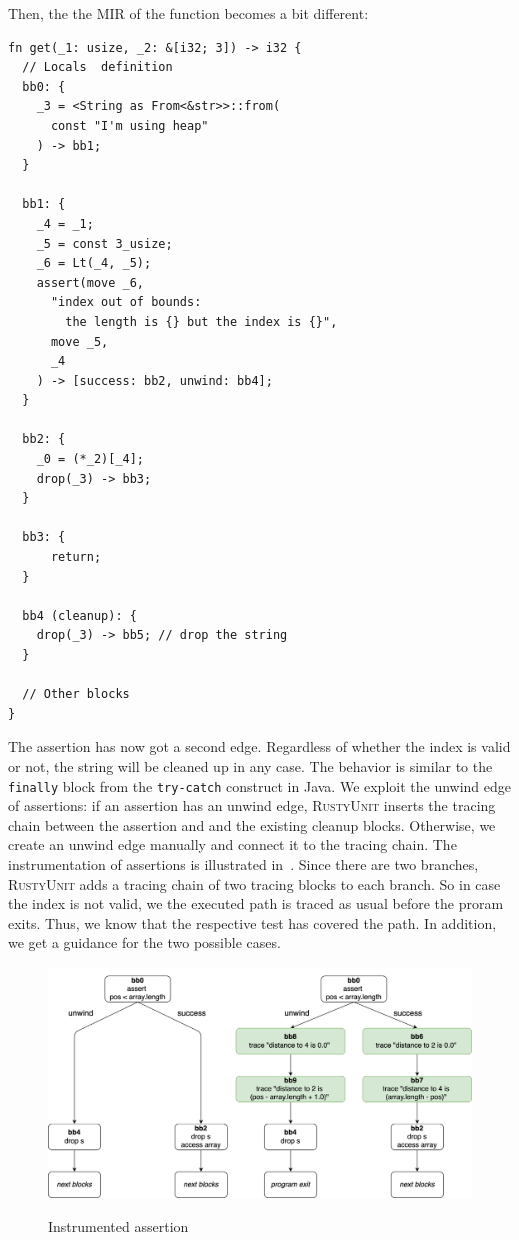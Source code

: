 \documentclass[paper=a4,%
  twoside,%
  BCOR4mm,%
  abstract=true,%
  toc=bibliography,%
  chapterprefix=true,%
  toc=bibliographynumbered,%
  open=right,%
  english,%
  pagesize=pdftex]{scrreprt}
\newcommand{\tech}{\textsc{RustyUnit}\xspace}
\newcommand{\mir}{\ac{MIR}\xspace}
\begin{document}
Then, the the \mir of the function becomes a bit different:
\begin{lstlisting}[language={}, style=boxed, caption={}, label=lst:mir-boundary-check-with-unwinding]
fn get(_1: usize, _2: &[i32; 3]) -> i32 {
  // Locals  definition
  bb0: {
    _3 = <String as From<&str>>::from(
      const "I'm using heap"
    ) -> bb1;
  }

  bb1: {
    _4 = _1;
    _5 = const 3_usize;
    _6 = Lt(_4, _5);
    assert(move _6,
      "index out of bounds:
        the length is {} but the index is {}",
      move _5,
      _4
    ) -> [success: bb2, unwind: bb4];
  }

  bb2: {
    _0 = (*_2)[_4];
    drop(_3) -> bb3;
  }

  bb3: {
      return;
  }

  bb4 (cleanup): {
    drop(_3) -> bb5; // drop the string
  }

  // Other blocks
}
\end{lstlisting}

The assertion has now got a second edge. Regardless of whether the index is valid or not, the string will be cleaned up in any case. The behavior is similar to the \texttt{finally} block from the \texttt{try-catch} construct in Java. We exploit the unwind edge of assertions: if an assertion has an unwind edge, \tech inserts the tracing chain between the assertion and and the existing cleanup blocks. Otherwise, we create an unwind edge manually and connect it to the tracing chain. The instrumentation of assertions is illustrated in~. Since there are two branches, \tech adds a tracing chain of two tracing blocks to each branch. So in case the index is not valid, we the executed path is traced as usual before the proram exits. Thus, we know that the respective test has covered the path. In addition, we get a guidance for the two possible cases.

\begin{figure}[h]
\caption{Instrumented assertion}
\centering
\includegraphics[width=\textwidth]{comparison-instrumented-assertion}
\label{fig:comparison-instrumented-assertion}
\end{figure}
\end{document}
